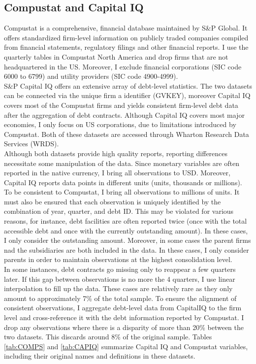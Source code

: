 \documentclass[12pt]{article}
\begin{document}
\subsection{Compustat and Capital IQ}
Compustat is a comprehensive, financial database maintained by S\&P Global. It offers standardized firm-level information on publicly traded companies compiled from financial statements, regulatory filings and other financial reports. I use the quarterly tables in Compustat North America and drop firms that are not headquartered in the US. Moreover, I exclude financial corporations (SIC code 6000 to 6799) and utility providers (SIC code 4900-4999). \vspace{3mm} \\
S\&P Capital IQ offers an extensive array of debt-level statistics. The two datasets can be connected via the unique firm a identifier (GVKEY), moreover Capital IQ covers most of the Compustat firms and yields consistent firm-level debt data after the aggregation of debt contracts. Although Capital IQ covers most major economies, I only focus on US corporations, due to limitations introduced by Compustat. Both of these datasets are accessed through Wharton Research Data Services (WRDS). \vspace{3mm} \\
Although both datasets provide high quality reports, reporting differences necessitate some manipulation of the data. Since monetary variables are often reported in the native currency, I bring all observations to USD. Moreover, Capital IQ reports data points in different units (units, thousands or millions). To be consistent to Compustat, I bring all observations to millions of units. It must also be ensured that each observation is uniquely identified by the combination of year, quarter, and debt ID. This may be violated for various reasons, for instance, debt facilities are often reported twice (once with the total accessible debt and once with the currently outstanding amount). In these cases, I only consider the outstanding amount. Moreover, in some cases the parent firms nad the subsidiaries are both included in the data. In these cases, I only consider parents in order to maintain observations at the highest consolidation level. \vspace{3mm} \\
In some instances, debt contracts go missing only to reappear a few quarters later. If this gap between observations is no more the 4 quarters, I use linear interpolation to fill up the data. These cases are relatively rare as they only amount to approximately 7\% of the total sample. To ensure the alignment of consistent observations, I aggregate debt-level data from CapitalIQ to the firm level and cross-reference it with the debt information reported by Compustat. I drop any observations where there is a disparity of more than 20\% between the two datasets. This discards around 8\% of the original sample. Tables \ref{tab:COMPS} and \ref{tab:CAPIQ} summarize Capital IQ and Compustat variables, including their original names and definitions in these datasets. \vspace{3mm} \\
\end{document}
